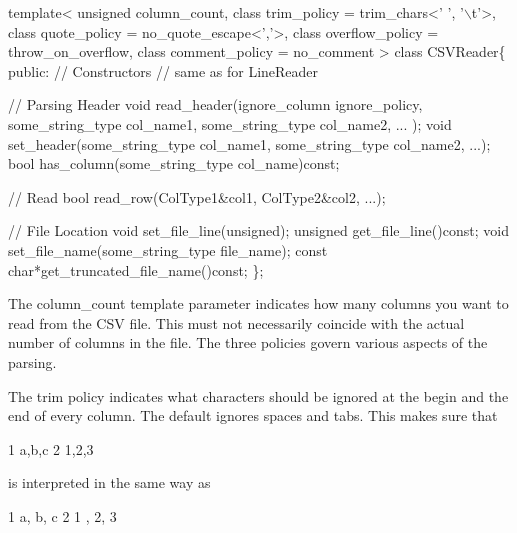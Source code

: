 \begin{DoxyCode}
\textcolor{keyword}{template}<
  \textcolor{keywordtype}{unsigned} column\_count,
  \textcolor{keyword}{class }trim\_policy = trim\_chars<' ', '\(\backslash\)t'>, 
  \textcolor{keyword}{class }quote\_policy = no\_quote\_escape<','>,
  \textcolor{keyword}{class }overflow\_policy = throw\_on\_overflow,
  \textcolor{keyword}{class }comment\_policy = no\_comment
>
\textcolor{keyword}{class }CSVReader\{
\textcolor{keyword}{public}:
  \textcolor{comment}{// Constructors}
  \textcolor{comment}{// same as for LineReader}

  \textcolor{comment}{// Parsing Header}
  \textcolor{keywordtype}{void} read\_header(ignore\_column ignore\_policy, some\_string\_type col\_name1, some\_string\_type col\_name2, ...
      );
  \textcolor{keywordtype}{void} set\_header(some\_string\_type col\_name1, some\_string\_type col\_name2, ...);
  \textcolor{keywordtype}{bool} has\_column(some\_string\_type col\_name)\textcolor{keyword}{const};

  \textcolor{comment}{// Read}
  \textcolor{keywordtype}{bool} read\_row(ColType1&col1, ColType2&col2, ...);

  \textcolor{comment}{// File Location }
  \textcolor{keywordtype}{void} set\_file\_line(\textcolor{keywordtype}{unsigned});
  \textcolor{keywordtype}{unsigned} get\_file\_line()\textcolor{keyword}{const};
  \textcolor{keywordtype}{void} set\_file\_name(some\_string\_type file\_name);
  \textcolor{keyword}{const} \textcolor{keywordtype}{char}*get\_truncated\_file\_name()\textcolor{keyword}{const};
\};
\end{DoxyCode}


The {\ttfamily column\+\_\+count} template parameter indicates how many columns you want to read from the C\+SV file. This must not necessarily coincide with the actual number of columns in the file. The three policies govern various aspects of the parsing.

The trim policy indicates what characters should be ignored at the begin and the end of every column. The default ignores spaces and tabs. This makes sure that


\begin{DoxyCode}
1 a,b,c
2 1,2,3
\end{DoxyCode}


is interpreted in the same way as


\begin{DoxyCode}
1   a, b,   c
2 1  , 2,   3
\end{DoxyCode}


